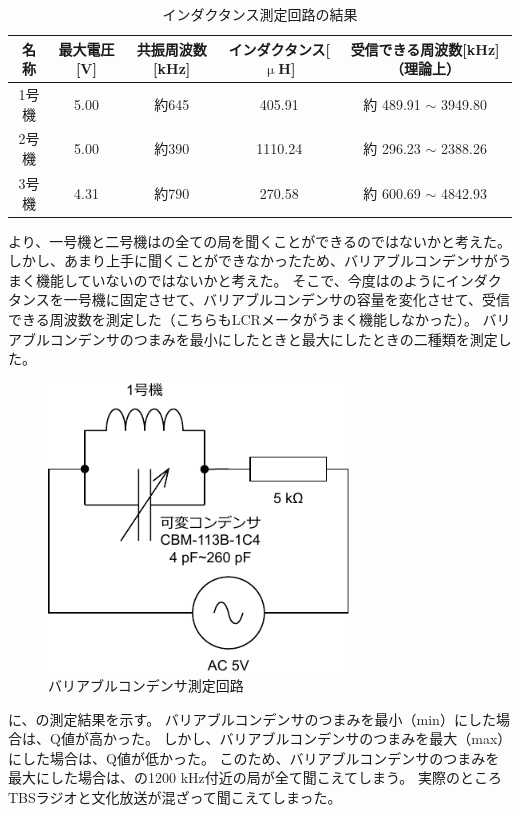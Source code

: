\documentclass[report.tex]{subfiles}
\begin{document}
\begin{table}[H]
	\centering
	\caption{インダクタンス測定回路の結果}
	\label{tab:ant2}
	\begin{tabular}{ccccc} \hline
		名称  & 最大電圧[V] & 共振周波数[kHz] & インダクタンス[\(\upmu\)H] & 受信できる周波数[kHz]（理論上）        \\ \hline
		1号機 & 5.00    & 約645       & 405.91              & 約 489.91 \(\sim\) 3949.80 \\
		2号機 & 5.00    & 約390       & 1110.24             & 約 296.23 \(\sim\) 2388.26 \\
		3号機 & 4.31    & 約790       & 270.58              & 約 600.69 \(\sim\) 4842.93 \\ \hline
	\end{tabular}
\end{table}

より、一号機と二号機はの全ての局を聞くことができるのではないかと考えた。
しかし、あまり上手に聞くことができなかったため、バリアブルコンデンサがうまく機能していないのではないかと考えた。
そこで、今度はのようにインダクタンスを一号機に固定させて、バリアブルコンデンサの容量を変化させて、受信できる周波数を測定した（こちらもLCRメータがうまく機能しなかった）。
バリアブルコンデンサのつまみを最小にしたときと最大にしたときの二種類を測定した。

\begin{figure}[H]
	\centering
	\includegraphics[width=8cm]{fig/inda3.pdf}
	\caption{バリアブルコンデンサ測定回路}
	\label{fig:inda3}
\end{figure}

に、の測定結果を示す。
バリアブルコンデンサのつまみを最小（min）にした場合は、Q値が高かった。
しかし、バリアブルコンデンサのつまみを最大（max）にした場合は、Q値が低かった。
このため、バリアブルコンデンサのつまみを最大にした場合は、の1200 kHz付近の局が全て聞こえてしまう。
実際のところTBSラジオと文化放送が混ざって聞こえてしまった。
\end{document}
